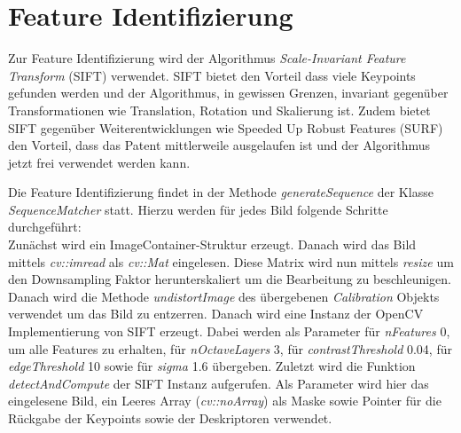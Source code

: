 \section{Feature Identifizierung}\label{sec:feature-identification}
Zur Feature Identifizierung wird der Algorithmus \emph{Scale-Invariant Feature Transform} (SIFT) verwendet.
SIFT bietet den Vorteil dass viele Keypoints gefunden werden und der Algorithmus, in gewissen Grenzen, invariant gegenüber Transformationen wie Translation, Rotation und Skalierung ist.
Zudem bietet SIFT gegenüber Weiterentwicklungen wie Speeded Up Robust Features (SURF) den Vorteil, dass das Patent mittlerweile ausgelaufen ist und der Algorithmus jetzt frei verwendet werden kann.

Die Feature Identifizierung findet in der Methode \emph{generateSequence} der Klasse \emph{SequenceMatcher} statt.
Hierzu werden für jedes Bild folgende Schritte durchgeführt:\\
Zunächst wird ein ImageContainer-Struktur erzeugt.
Danach wird das Bild mittels \emph{cv::imread} als \emph{cv::Mat} eingelesen.
Diese Matrix wird nun mittels \emph{resize} um den Downsampling Faktor herunterskaliert um die Bearbeitung zu beschleunigen.
Danach wird die Methode \emph{undistortImage} des übergebenen \emph{Calibration} Objekts verwendet um das Bild zu entzerren.
Danach wird eine Instanz der OpenCV Implementierung von SIFT erzeugt.
Dabei werden als Parameter für \emph{nFeatures} 0, um alle Features zu erhalten, für \emph{nOctaveLayers} 3, für \emph{contrastThreshold} 0.04, für \emph{edgeThreshold} 10 sowie für \emph{sigma} 1.6 übergeben.
Zuletzt wird die Funktion \emph{detectAndCompute} der SIFT Instanz aufgerufen.
Als Parameter wird hier das eingelesene Bild, ein Leeres Array (\emph{cv::noArray}) als Maske sowie Pointer für die Rückgabe der Keypoints sowie der Deskriptoren verwendet.